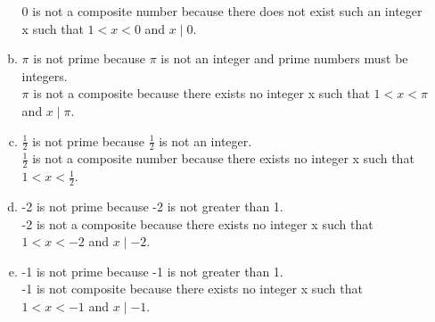 \documentclass{article}
\begin{document}
\begin{enumerate}[label=(3.\arabic*),start=1]
\begin{enumerate}[(a)]
                  0 is not a composite number because there does not exist such an integer x such that $1<x<0$ and $x\mid0$.
            \item $\pi$ is not prime because $\pi$ is not an integer and prime numbers must be integers. \\
                  $\pi$ is not a composite because there exists no integer x such that $1<x<\pi$ and $x\mid\pi$.
            \item $\frac{1}{2}$ is not prime because $\frac{1}{2}$ is not an integer. \\
            $\frac{1}{2}$ is not a composite number because there exists no integer x such that $1<x<\frac{1}{2}$. 
            \item -2 is not prime because -2 is not greater than 1. \\
                  -2 is not a composite because there exists no integer x such that $1<x<-2$ and $x\mid-2$.
            \item -1 is not prime because -1 is not greater than 1. \\
                  -1 is not composite because there exists no integer x such that $1<x<-1$ and $x\mid-1$.
        \end{enumerate}
\end{enumerate}
\end{document}
